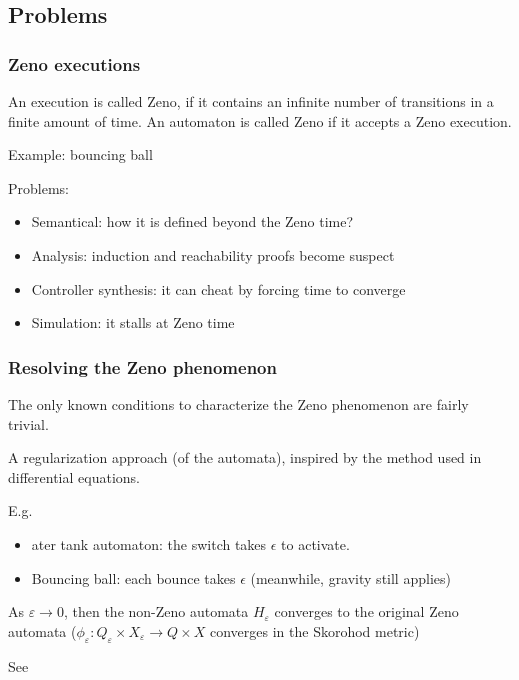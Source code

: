

\subsection{Problems}

\begin{frame}
\frametitle{Zeno executions}

An execution is called Zeno, if it contains an infinite number of transitions in a finite
amount of time. An automaton is called Zeno if it accepts a Zeno execution.

Example: bouncing ball

Problems: 
\begin{itemize}
	\item Semantical: how it is defined beyond the Zeno time?
	\item Analysis: induction and reachability proofs become suspect
	\item Controller synthesis: it can cheat by forcing time to converge
	\item Simulation: it stalls at Zeno time
\end{itemize}

\end{frame}






\begin{frame}
	\frametitle{Resolving the Zeno phenomenon}
	The only known conditions to characterize the Zeno phenomenon are fairly trivial.
	
	A regularization approach (of the automata), inspired by the method used in differential equations.
	
	E.g. 
	\begin{itemize}
		\item	ater tank automaton: the switch takes $\epsilon$ to activate.
		\item Bouncing ball: each bounce takes $\epsilon$ (meanwhile, gravity still applies) 		
	\end{itemize}
	
	As $\varepsilon \rightarrow 0$, then the non-Zeno automata $H_\varepsilon $ converges to the original Zeno automata ($\phi_\varepsilon : Q_\varepsilon \times X_\varepsilon \rightarrow Q \times X$ converges in the Skorohod metric)
	
	 See %
			
\end{frame}

